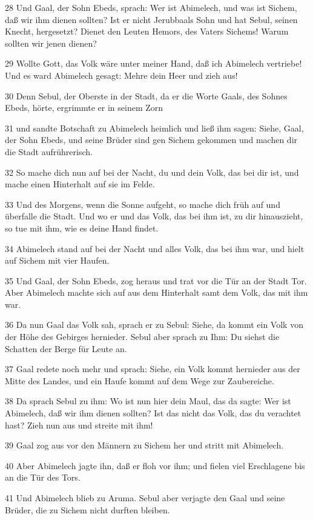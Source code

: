 \par 28 Und Gaal, der Sohn Ebeds, sprach: Wer ist Abimelech, und was ist Sichem, daß wir ihm dienen sollten? Ist er nicht Jerubbaals Sohn und hat Sebul, seinen Knecht, hergesetzt? Dienet den Leuten Hemors, des Vaters Sichems! Warum sollten wir jenen dienen?
\par 29 Wollte Gott, das Volk wäre unter meiner Hand, daß ich Abimelech vertriebe! Und es ward Abimelech gesagt: Mehre dein Heer und zieh aus!
\par 30 Denn Sebul, der Oberste in der Stadt, da er die Worte Gaals, des Sohnes Ebeds, hörte, ergrimmte er in seinem Zorn
\par 31 und sandte Botschaft zu Abimelech heimlich und ließ ihm sagen: Siehe, Gaal, der Sohn Ebeds, und seine Brüder sind gen Sichem gekommen und machen dir die Stadt aufrührerisch.
\par 32 So mache dich nun auf bei der Nacht, du und dein Volk, das bei dir ist, und mache einen Hinterhalt auf sie im Felde.
\par 33 Und des Morgens, wenn die Sonne aufgeht, so mache dich früh auf und überfalle die Stadt. Und wo er und das Volk, das bei ihm ist, zu dir hinauszieht, so tue mit ihm, wie es deine Hand findet.
\par 34 Abimelech stand auf bei der Nacht und alles Volk, das bei ihm war, und hielt auf Sichem mit vier Haufen.
\par 35 Und Gaal, der Sohn Ebeds, zog heraus und trat vor die Tür an der Stadt Tor. Aber Abimelech machte sich auf aus dem Hinterhalt samt dem Volk, das mit ihm war.
\par 36 Da nun Gaal das Volk sah, sprach er zu Sebul: Siehe, da kommt ein Volk von der Höhe des Gebirges hernieder. Sebul aber sprach zu Ihm: Du siehst die Schatten der Berge für Leute an.
\par 37 Gaal redete noch mehr und sprach: Siehe, ein Volk kommt hernieder aus der Mitte des Landes, und ein Haufe kommt auf dem Wege zur Zaubereiche.
\par 38 Da sprach Sebul zu ihm: Wo ist nun hier dein Maul, das da sagte: Wer ist Abimelech, daß wir ihm dienen sollten? Ist das nicht das Volk, das du verachtet hast? Zieh nun aus und streite mit ihm!
\par 39 Gaal zog aus vor den Männern zu Sichem her und stritt mit Abimelech.
\par 40 Aber Abimelech jagte ihn, daß er floh vor ihm; und fielen viel Erschlagene bis an die Tür des Tors.
\par 41 Und Abimelech blieb zu Aruma. Sebul aber verjagte den Gaal und seine Brüder, die zu Sichem nicht durften bleiben.
